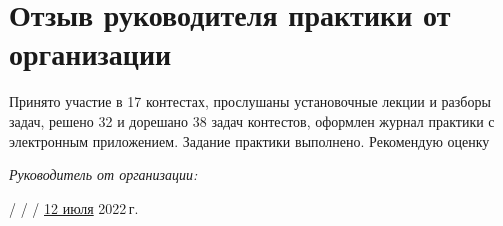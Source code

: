 \section{Отзыв руководителя практики от организации}

Принято участие в 17 контестах, прослушаны установочные лекции и разборы задач, решено 32 и дорешано 38 задач контестов, оформлен журнал практики с электронным приложением. Задание практики выполнено. Рекомендую оценку

\vspace{10pt}

\textit{Руководитель от организации:}

 /  /  / \underline{12 июля} 2022\,г.

\pagebreak
